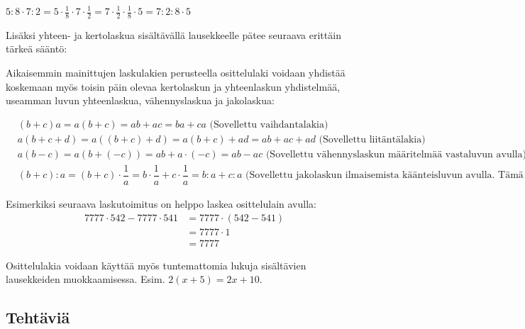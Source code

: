 \begin{esimerkki}
$5:8\cdot 7:2=5\cdot\frac18\cdot 7\cdot\frac12=7\cdot \frac12\cdot\frac18\cdot 5=7:2:8\cdot 5$
\end{esimerkki} 

Lisäksi yhteen- ja kertolaskua sisältävällä lausekkeelle pätee seuraava erittäin tärkeä sääntö:


Aikaisemmin mainittujen laskulakien perusteella osittelulaki voidaan yhdistää koskemaan myös toisin päin olevaa kertolaskun ja yhteenlaskun yhdistelmää, useamman luvun yhteenlaskua, vähennyslaskua ja jakolaskua:

\begin{align*}
&(b+c)a = a(b+c) = ab+ac = ba+ca \text{ (Sovellettu vaihdantalakia)} \\
&a(b+c+d) = a((b+c)+d) = a(b+c)+ad = ab+ac+ad \text{ (Sovellettu liitäntälakia)} \\
&a(b-c) = a(b+(-c))=ab+a\cdot(-c)=ab-ac \text{ (Sovellettu vähennyslaskun määritelmää vastaluvun avulla)} \\
&(b+c):a = (b+c)\cdot\dfrac1a = b\cdot\dfrac1a+c\cdot\dfrac1a = b:a+c:a \text{ (Sovellettu jakolaskun ilmaisemista käänteisluvun avulla. Tämä ominaisuus esitellään myöhemmin rationaalilukujen yhteydessä.) }
\end{align*}

Esimerkiksi seuraava laskutoimitus on helppo laskea osittelulain avulla: 
     \begin{align*}
	  7777\cdot 542-7777\cdot 541 &= 7777\cdot (542-541)  \\ &= 7777\cdot 1 \\ &= 7777
     \end{align*}


Osittelulakia voidaan käyttää myös tuntemattomia lukuja sisältävien lausekkeiden muokkaamisessa. Esim. $2(x+5)=2x+10$.
    

\subsection*{Tehtäviä}
   
